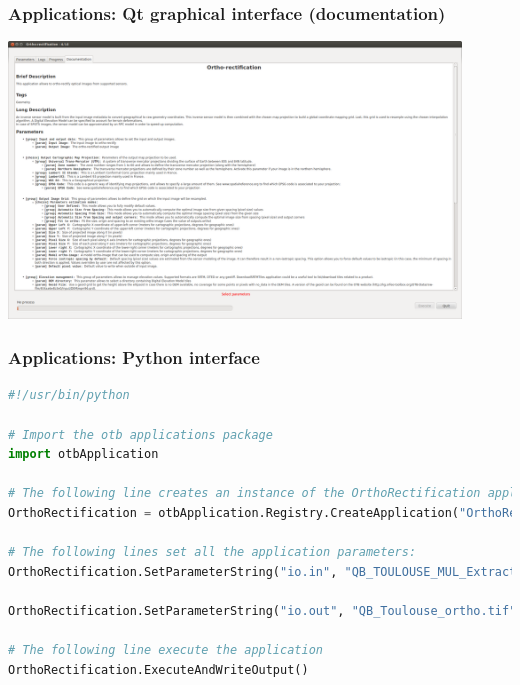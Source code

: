 \documentclass[8pt]{beamer}
\begin{document}
\begin{frame}[fragile]
\frametitle{Applications: Qt graphical interface (documentation)}
\begin{center}
\includegraphics[width=0.9\textwidth]{images/app_doc.png}
\end{center}
\end{frame}

\begin{frame}[fragile]
\frametitle{Applications: Python interface}
\begin{lstlisting}[language=python,breaklines=true,breakatwhitespace=true,frame = tb,framerule = 0.25pt,fontadjust,backgroundcolor={\color{listlightgray}},basicstyle = {\ttfamily\tiny},keywordstyle = {\ttfamily\color{listkeyword}\textbf},identifierstyle = {\ttfamily},commentstyle = {\ttfamily\color{listcomment}\textit},stringstyle = {\ttfamily},showstringspaces = false,showtabs = false,numbers = none,numbersep = 6pt, numberstyle={\ttfamily\color{listnumbers}},tabsize = 2]
#!/usr/bin/python 
 
# Import the otb applications package 
import otbApplication 
 
# The following line creates an instance of the OrthoRectification application 
OrthoRectification = otbApplication.Registry.CreateApplication("OrthoRectification") 
 
# The following lines set all the application parameters: 
OrthoRectification.SetParameterString("io.in", "QB_TOULOUSE_MUL_Extract_500_500.tif") 
 
OrthoRectification.SetParameterString("io.out", "QB_Toulouse_ortho.tif") 
 
# The following line execute the application 
OrthoRectification.ExecuteAndWriteOutput()
\end{lstlisting}
\end{frame}
\end{document}
